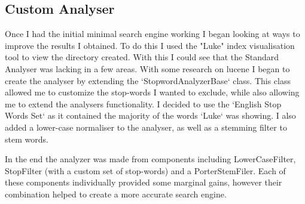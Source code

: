 \subsection{Custom Analyser}
Once I had the initial minimal search engine working I began looking at ways to improve the results I obtained. To do this I used the "Luke" index visualisation tool to view the directory created. With this I could see that the Standard Analyser was lacking in a few areas. With some research on lucene I began to create the analyser by extending the  `StopwordAnalyzerBase` class. This class allowed me to customize the stop-words I wanted to exclude, while also allowing me to extend the analysers functionality. I decided to use the `English Stop Words Set` as it contained the majority of the words `Luke` was showing. I also added a lower-case normaliser to the analyser, as well as a stemming filter to stem words.\par
In the end the analyzer was made from components including LowerCaseFilter, StopFilter (with a custom set of stop-words) and a PorterStemFiler. Each of these components individually provided some marginal gains, however their combination helped to create a more accurate search engine.

